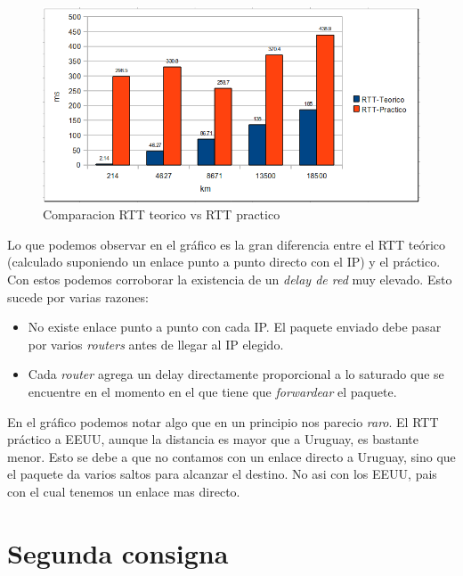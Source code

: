 \documentclass[a4paper]{article}
\begin{document}
\begin{figure}[H]
  \centering
  \includegraphics[scale=0.60]{graficos/comparacionRTT.png}
  \caption{Comparacion RTT teorico vs RTT practico }
\end{figure}


Lo que podemos observar en el gráfico es la gran diferencia entre el RTT teórico (calculado suponiendo un enlace punto a punto directo con el IP) y el práctico. Con estos podemos corroborar la existencia de un \textit{delay de red} muy elevado. Esto sucede por varias razones:
\begin{itemize}
	\item No existe enlace punto a punto con cada IP. El paquete enviado debe pasar por varios \textit{routers} antes de llegar al IP elegido.
	\item Cada \textit{router} agrega un delay directamente proporcional a lo saturado que se encuentre en el momento en el que tiene que \textit{forwardear} el paquete. 
\end{itemize}

En el gráfico podemos notar algo que en un principio nos parecio \textit{raro}. El RTT práctico a EEUU, aunque la distancia es mayor que a Uruguay, es bastante menor. Esto se debe a que no contamos con un enlace directo a Uruguay, sino que el paquete da varios saltos para alcanzar el destino. No asi con los EEUU, pais con el cual tenemos un enlace mas directo.  



\section{Segunda consigna}
\end{document}
